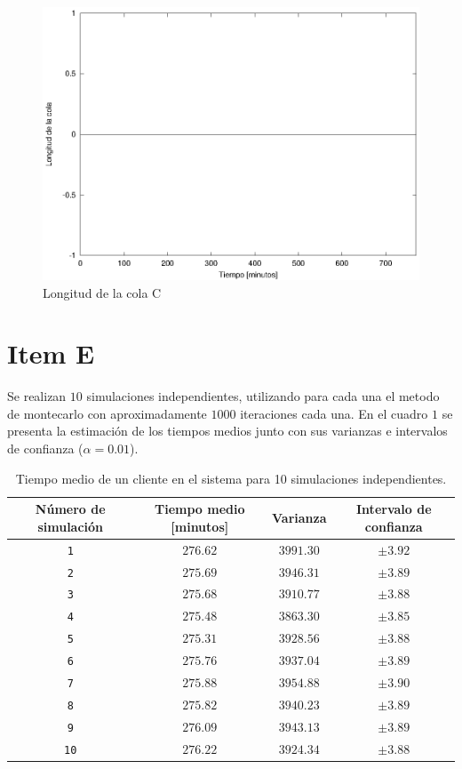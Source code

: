 \documentclass[a4paper,10pt]{article}
\begin{document}
\begin{figure}[hp]
\centering
\includegraphics{graficos/plot_longitud_C.eps}
\caption{Longitud de la cola C}
\label{fig:colaC}
\end{figure}

\section*{Item E}
Se realizan $10$ simulaciones independientes, utilizando para cada una el metodo de montecarlo con aproximadamente $1000$ iteraciones cada una.
En el cuadro $1$ se presenta la estimaci\'on de los tiempos medios junto con sus varianzas e intervalos de confianza ($\alpha = 0.01$).\\
\begin{table}
\begin{center}
\begin{tabular}{cccc} \hline \hline
N\'umero de simulaci\'on & Tiempo medio [minutos] & Varianza & Intervalo de confianza\\ \hline
\texttt{1}	& $276.62$ & $3991.30$ & $\pm3.92$\\
\texttt{2}	& $275.69$ & $3946.31$ & $\pm3.89$\\
\texttt{3}	& $275.68$ & $3910.77$ & $\pm3.88$\\
\texttt{4}	& $275.48$ & $3863.30$ & $\pm3.85$\\
\texttt{5}	& $275.31$ & $3928.56$ & $\pm3.88$\\
\texttt{6}	& $275.76$ & $3937.04$ & $\pm3.89$\\
\texttt{7}	& $275.88$ & $3954.88$ & $\pm3.90$\\
\texttt{8}	& $275.82$ & $3940.23$ & $\pm3.89$\\
\texttt{9}	& $276.09$ & $3943.13$ & $\pm3.89$\\
\texttt{10}	& $276.22$ & $3924.34$ & $\pm3.88$\\
\hline \hline
\end{tabular}
\end{center}
\label{tab:tiemposmedios}
\vspace{4pt}
\caption{Tiempo medio de un cliente en el sistema para 10 simulaciones
independientes.}
\end{table}
\end{document}
